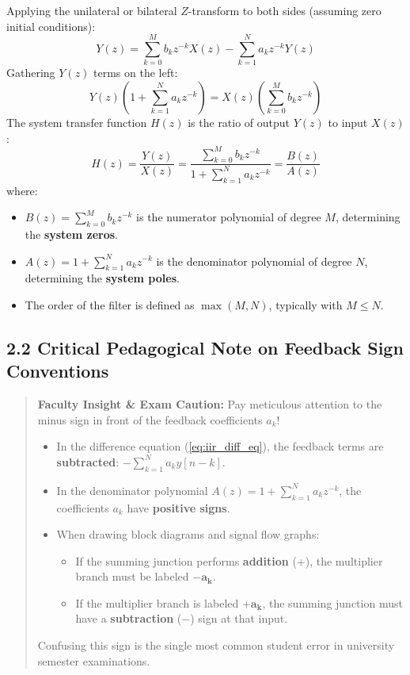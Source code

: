 \documentclass[11pt,a4paper]{article}
\begin{document}
Applying the unilateral or bilateral $Z$-transform to both sides (assuming zero initial conditions):
\begin{equation}
Y(z) = \sum_{k=0}^{M} b_k z^{-k} X(z) - \sum_{k=1}^{N} a_k z^{-k} Y(z)
\end{equation}
Gathering $Y(z)$ terms on the left:
\begin{equation}
Y(z) \left( 1 + \sum_{k=1}^{N} a_k z^{-k} \right) = X(z) \left( \sum_{k=0}^{M} b_k z^{-k} \right)
\end{equation}
The system transfer function $H(z)$ is the ratio of output $Y(z)$ to input $X(z)$:
\begin{equation}
H(z) = \frac{Y(z)}{X(z)} = \frac{\sum_{k=0}^{M} b_k z^{-k}}{1 + \sum_{k=1}^{N} a_k z^{-k}} = \frac{B(z)}{A(z)}
\label{eq:iir_transfer_function}
\end{equation}
where:
\begin{itemize}
    \item $B(z) = \sum_{k=0}^{M} b_k z^{-k}$ is the numerator polynomial of degree $M$, determining the \textbf{system zeros}.
    \item $A(z) = 1 + \sum_{k=1}^{N} a_k z^{-k}$ is the denominator polynomial of degree $N$, determining the \textbf{system poles}.
    \item The order of the filter is defined as $\max(M, N)$, typically with $M \le N$.
\end{itemize}

\subsection{2.2 Critical Pedagogical Note on Feedback Sign Conventions}
\begin{quote}
\textbf{Faculty Insight \& Exam Caution:} 
Pay meticulous attention to the minus sign in front of the feedback coefficients $a_k$!
\begin{itemize}
    \item In the difference equation (\ref{eq:iir_diff_eq}), the feedback terms are \textbf{subtracted}: $-\sum_{k=1}^N a_k y[n-k]$.
    \item In the denominator polynomial $A(z) = 1 + \sum_{k=1}^N a_k z^{-k}$, the coefficients $a_k$ have \textbf{positive signs}.
    \item When drawing block diagrams and signal flow graphs:
    \begin{itemize}
        \item If the summing junction performs \textbf{addition} ($+$), the multiplier branch must be labeled $\mathbf{-a_k}$.
        \item If the multiplier branch is labeled $\mathbf{+a_k}$, the summing junction must have a \textbf{subtraction} ($-$) sign at that input.
    \end{itemize}
\end{itemize}
Confusing this sign is the single most common student error in university semester examinations.
\end{quote}
\end{document}
